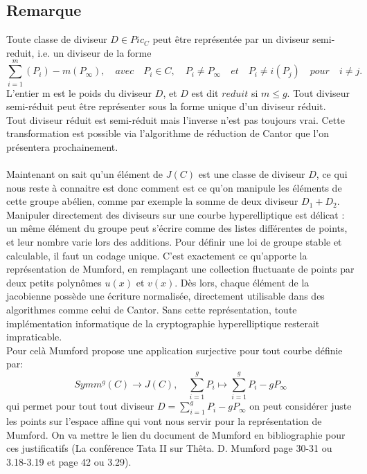 \documentclass[12pt,a4paper]{article}
\begin{document}
	\subsection{Remarque}
	Toute classe de diviseur $D \in Pic_C$ peut être représent\'ee par un diviseur semi-reduit, i.e. un diviseur de la forme
	\[
	\sum_{i=1}^{m} (P_i) - m(P_{\infty}),\quad avec\quad P_i \in C, \quad P_i \neq P_{\infty}\quad et \quad P_i \neq i(P_j)\quad pour\quad i \neq j.
	\]
	L'entier m est le poids du diviseur $D$, et $D$ est dit $reduit$ si $m \leq g$. Tout diviseur semi-réduit peut être représenter sous la forme unique d'un diviseur réduit.\\Tout diviseur réduit est semi-réduit mais l'inverse n'est pas toujours vrai. Cette transformation est possible via l'algorithme de réduction de Cantor que l'on présentera prochainement. 
	
	\paragraph{}
	Maintenant on sait qu'un élément de $J(C)$ est une classe de diviseur $D$, ce qui nous reste \`a connaitre est donc comment est ce qu'on manipule les éléments de cette groupe abélien, comme par exemple la somme de deux diviseur $D_1 + D_2$. Manipuler directement des diviseurs sur une courbe hyperelliptique est délicat : un même élément du groupe peut s’écrire comme des listes différentes de points, et leur nombre varie lors des additions. Pour définir une loi de groupe stable et calculable, il faut un codage unique. C’est exactement ce qu’apporte la représentation de Mumford, en remplaçant une collection fluctuante de points par deux petits polynômes $u(x)$ et $v(x)$. Dès lors, chaque élément de la jacobienne possède une écriture normalisée, directement utilisable dans des algorithmes comme celui de Cantor. Sans cette représentation, toute implémentation informatique de la cryptographie hyperelliptique resterait impraticable.  \\
	Pour cel\`a Mumford propose une application surjective pour tout courbe définie par: \[ Symm^g(C) \rightarrow J(C), \quad \sum_{i=1}^{g} P_i \mapsto \sum_{i=1}^{g}P_i - gP_{\infty}
	\] qui permet pour tout tout diviseur $D = \sum_{i=1}^{g}P_i - gP_{\infty}$ on peut considérer juste les points sur l'espace affine qui vont nous servir pour la représentation de Mumford. On va mettre le lien du document de Mumford en bibliographie pour ces justificatifs (La conférence Tata II sur Thêta. D. Mumford page 30-31 ou 3.18-3.19 et page 42 ou 3.29).  
\end{document}
